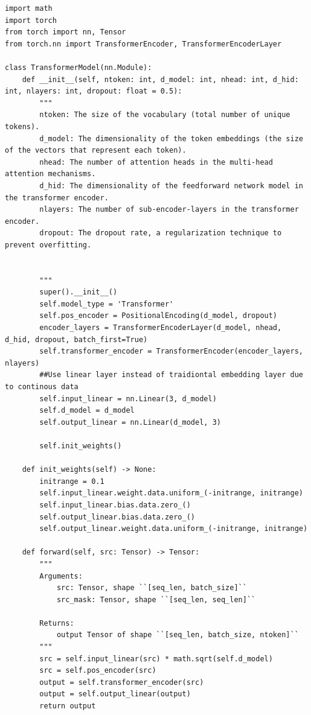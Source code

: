 \documentclass[11pt]{article}
\begin{document}
\begin{lstlisting}
import math
import torch
from torch import nn, Tensor
from torch.nn import TransformerEncoder, TransformerEncoderLayer

class TransformerModel(nn.Module):
    def __init__(self, ntoken: int, d_model: int, nhead: int, d_hid: int, nlayers: int, dropout: float = 0.5):
        """
        ntoken: The size of the vocabulary (total number of unique tokens).
        d_model: The dimensionality of the token embeddings (the size of the vectors that represent each token).
        nhead: The number of attention heads in the multi-head attention mechanisms.
        d_hid: The dimensionality of the feedforward network model in the transformer encoder.
        nlayers: The number of sub-encoder-layers in the transformer encoder.
        dropout: The dropout rate, a regularization technique to prevent overfitting.


        """
        super().__init__()
        self.model_type = 'Transformer'
        self.pos_encoder = PositionalEncoding(d_model, dropout)
        encoder_layers = TransformerEncoderLayer(d_model, nhead, d_hid, dropout, batch_first=True)
        self.transformer_encoder = TransformerEncoder(encoder_layers, nlayers)
        ##Use linear layer instead of traidiontal embedding layer due to continous data
        self.input_linear = nn.Linear(3, d_model)
        self.d_model = d_model
        self.output_linear = nn.Linear(d_model, 3)

        self.init_weights()

    def init_weights(self) -> None:
        initrange = 0.1
        self.input_linear.weight.data.uniform_(-initrange, initrange)
        self.input_linear.bias.data.zero_()
        self.output_linear.bias.data.zero_()
        self.output_linear.weight.data.uniform_(-initrange, initrange)

    def forward(self, src: Tensor) -> Tensor:
        """
        Arguments:
            src: Tensor, shape ``[seq_len, batch_size]``
            src_mask: Tensor, shape ``[seq_len, seq_len]``

        Returns:
            output Tensor of shape ``[seq_len, batch_size, ntoken]``
        """
        src = self.input_linear(src) * math.sqrt(self.d_model)
        src = self.pos_encoder(src)
        output = self.transformer_encoder(src)
        output = self.output_linear(output)
        return output
    
\end{lstlisting}
\end{document}
